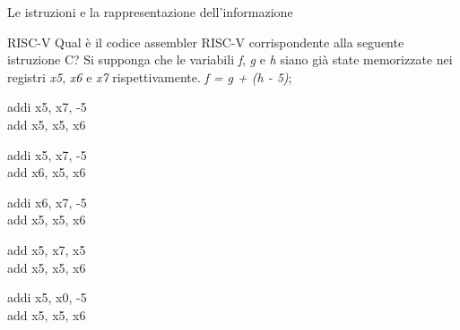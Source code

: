 \documentclass[11pt]{article}
\begin{document}
\begin{quiz}{Le istruzioni e la rappresentazione dell'informazione}

\begin{multi}[points=1,,shuffle=true]{RISC-V}
Qual è il codice assembler RISC-V corrispondente alla seguente istruzione C? 
Si supponga che le variabili \textit{f}, \textit{g} e \textit{h} siano già state memorizzate 
nei registri \textit{x5}, \textit{x6} e \textit{x7} rispettivamente. 
%
\textit{f = g + (h - 5)};
%
\item* addi x5, x7, -5 \\ add x5, x5, x6
\item  addi x5, x7, -5 \\ add x6, x5, x6
\item  addi x6, x7, -5 \\ add x5, x5, x6
\item  add  x5, x7, x5 \\ add x5, x5, x6
\item  addi x5, x0, -5 \\ add x5, x5, x6        
\end{multi}






\end{quiz}
\end{document}
